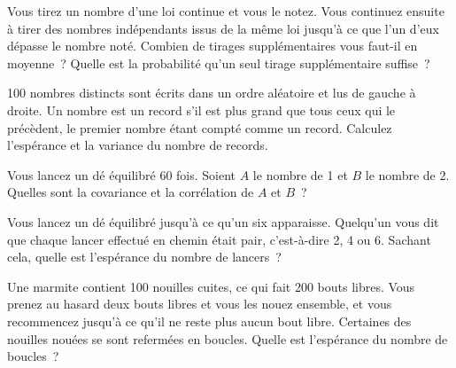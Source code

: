 \begin{question}\label{iq:iv1:expectation-and-indicators:11}
Vous tirez un nombre d'une loi continue et vous le notez. Vous continuez ensuite à tirer des nombres indépendants
issus de la même loi jusqu'à ce que l'un d'eux dépasse le nombre noté. Combien de tirages supplémentaires
vous faut-il en moyenne~? Quelle est la probabilité qu'un seul tirage supplémentaire suffise~?
\end{question}

\begin{question}\label{iq:iv1:expectation-and-indicators:12}
100 nombres distincts sont écrits dans un ordre aléatoire et lus de gauche à droite. Un nombre est un record s'il est
plus grand que tous ceux qui le précèdent, le premier nombre étant compté comme un record. Calculez l'espérance et la variance du
nombre de records.
\end{question}

\begin{question}\label{iq:iv1:expectation-and-indicators:13}
Vous lancez un dé équilibré 60 fois. Soient $A$ le nombre de 1 et $B$ le nombre de 2. Quelles sont la covariance
et la corrélation de $A$ et $B$~?
\end{question}

\begin{question}\label{iq:iv1:expectation-and-indicators:14}
Vous lancez un dé équilibré jusqu'à ce qu'un six apparaisse. Quelqu'un vous dit que chaque lancer effectué en chemin était pair, c'est-à-dire 2, 4
ou 6. Sachant cela, quelle est l'espérance du nombre de lancers~?
\end{question}

\begin{question}\label{iq:iv1:expectation-and-indicators:15}
Une marmite contient 100 nouilles cuites, ce qui fait 200 bouts libres. Vous prenez au hasard deux bouts libres et vous les
nouez ensemble, et vous recommencez jusqu'à ce qu'il ne reste plus aucun bout libre. Certaines des nouilles nouées se sont refermées en boucles. Quelle est
l'espérance du nombre de boucles~?
\end{question}

